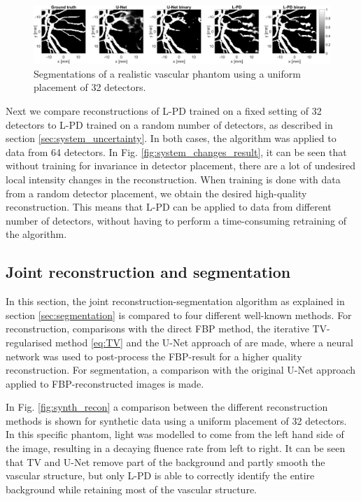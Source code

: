 \documentclass[journal]{IEEEtran}
\begin{document}
\begin{figure}[ht!]
\centering
\includegraphics[width=\linewidth]{images/paper_synthetic_segm.png}
\caption{Segmentations of a realistic vascular phantom using a uniform placement of 32 detectors.}
\label{fig:synth_segm}
\end{figure}

Next we compare reconstructions of L-PD trained on a fixed setting of 32 detectors to L-PD trained on a random number of detectors, as described in section \ref{sec:system_uncertainty}. In both cases, the algorithm was applied to data from 64 detectors. In Fig. \ref{fig:system_changes_result}, it can be seen that without training for invariance in detector placement, there are a lot of undesired local intensity changes in the reconstruction. When training is done with data from a random detector placement, we obtain the desired high-quality reconstruction. This means that L-PD can be applied to data from different number of detectors, without having to perform a time-consuming retraining of the algorithm. 

\subsection{Joint reconstruction and segmentation}
In this section, the joint reconstruction-segmentation algorithm as explained in section \ref{sec:segmentation} is compared to four different well-known methods. For reconstruction, comparisons with the direct FBP method, the iterative TV-regularised method \eqref{eq:TV} and the U-Net approach of \cite{Jin2017} are made, where a neural network was used to post-process the FBP-result for a higher quality reconstruction. For segmentation, a comparison with the original U-Net approach \cite{Ronneberger2015} applied to FBP-reconstructed images is made.

In Fig. \ref{fig:synth_recon} a comparison between the different reconstruction methods is shown for synthetic data using a uniform placement of 32 detectors. In this specific phantom, light was modelled to come from the left hand side of the image, resulting in a decaying fluence rate from left to right. It can be seen that TV and U-Net remove part of the background and partly smooth the vascular structure, but only L-PD is able to correctly identify the entire background while retaining most of the vascular structure. 
\end{document}

